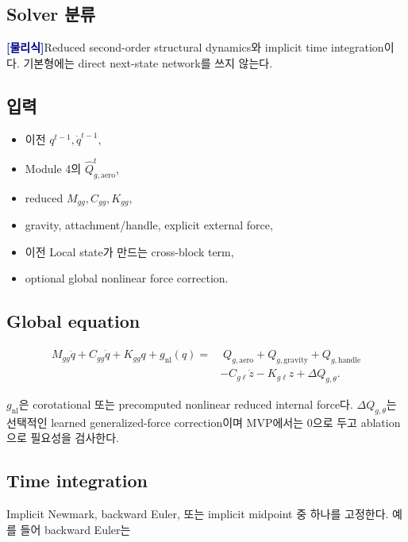 \documentclass[11pt,a4paper]{article}
\newcommand{\physics}{\textcolor{darkblue}{\textbf{[물리식]}}}
\begin{document}
\subsection*{Solver 분류}

\physics Reduced second-order structural dynamics와 implicit time integration이다.
기본형에는 direct next-state network를 쓰지 않는다.

\subsection*{입력}

\begin{itemize}[leftmargin=1.5em]
  \item 이전 \(q^{t-1},\dot q^{t-1}\),
  \item Module 4의 \(\widehat Q_{g,\mathrm{aero}}^t\),
  \item reduced \(M_{gg},C_{gg},K_{gg}\),
  \item gravity, attachment/handle, explicit external force,
  \item 이전 Local state가 만드는 cross-block term,
  \item optional global nonlinear force correction.
\end{itemize}

\subsection*{Global equation}

\begin{equation}
\begin{aligned}
  M_{gg}\ddot q
  +C_{gg}\dot q
  +K_{gg}q
  +g_{\mathrm{nl}}(q)
  =&\;
  Q_{g,\mathrm{aero}}
  +Q_{g,\mathrm{gravity}}
  +Q_{g,\mathrm{handle}}\\
  &-C_{g\ell}\dot z
  -K_{g\ell}z
  +\Delta Q_{g,\theta}.
  \label{eq:global-dynamics}
\end{aligned}
\end{equation}

\(g_{\mathrm{nl}}\)은 corotational 또는 precomputed nonlinear reduced internal force다.
\(\Delta Q_{g,\theta}\)는 선택적인 learned generalized-force correction이며
MVP에서는 0으로 두고 ablation으로 필요성을 검사한다.

\subsection*{Time integration}

Implicit Newmark, backward Euler, 또는 implicit midpoint 중 하나를 고정한다.
예를 들어 backward Euler는
\end{document}
